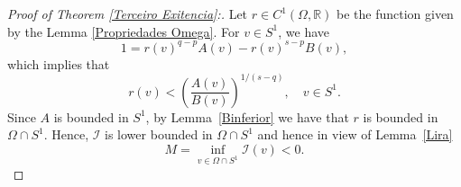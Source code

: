 \documentclass[12pt,reqno]{amsart}
\begin{document}
	
\begin{proof}[Proof of Theorem \ref{Terceiro Exitencia}:] Let $r \in C^1(\Omega,\mathds{R})$ be the function given by the Lemma \ref{Propriedades Omega}. For $v \in S^1$, we have
	\begin{equation*}
		1=r(v)^{q-p}A(v)-r(v)^{s-p}B(v),
	\end{equation*}
	which implies that
	\begin{equation}\label{A/B}
		r(v)<\left(\frac{A(v)}{B(v)}\right)^{1/(s-q)}, \quad v \in S^1.
	\end{equation}
Since $A$ is bounded in $S^1$, by Lemma~\ref{Binferior} we have that $r$ is bounded in $\Omega\cap S^1$. Hence, $\mathcal{I}$ is lower bounded in $\Omega\cap S^1$ and hence in view of Lemma~\ref{Lira}
\begin{equation}\label{variational problem}
		M=\inf_{v \in \Omega\cap S^1} \mathcal{I}(v)<0.
\end{equation}



\end{proof}
\end{document}
